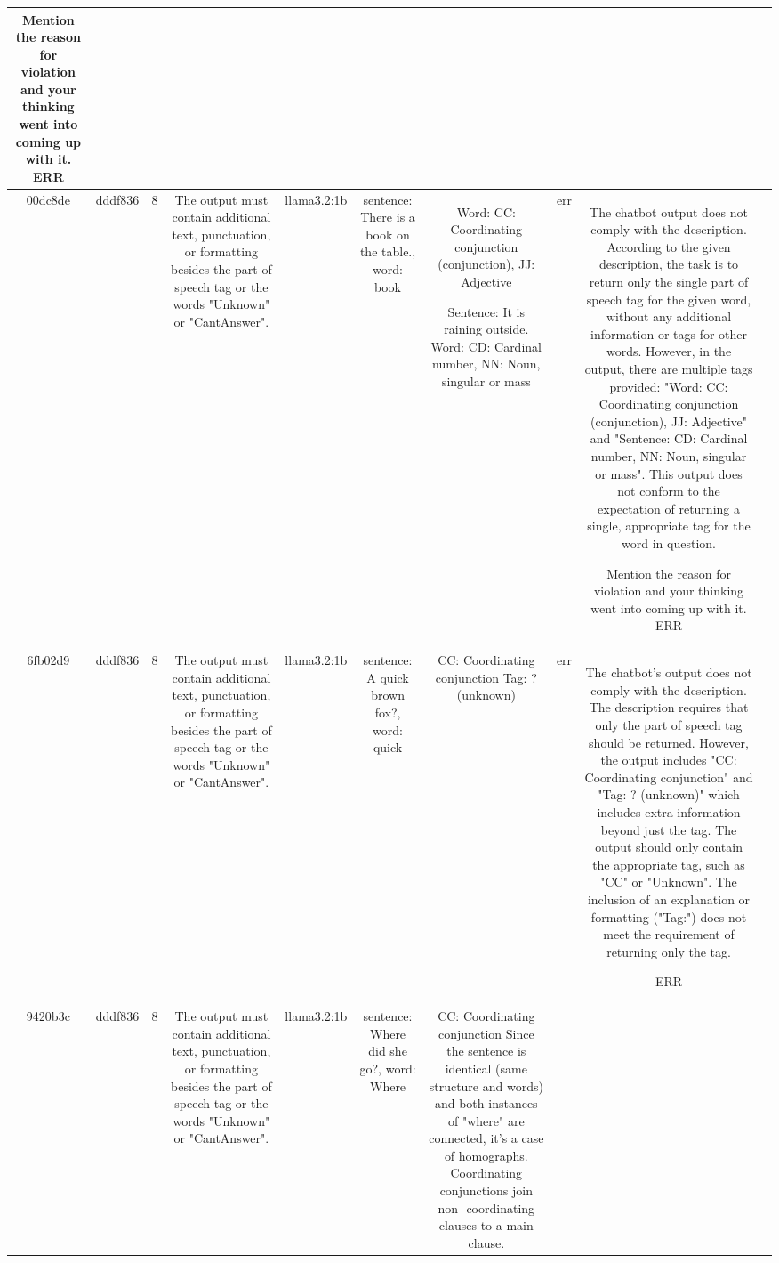 \begin{table}[h!]
\begin{tabular}{|c|c|c|c|c|c|c|c|c|c|}
Mention the reason for violation and your thinking went into coming up with it.
ERR & \\
\hline
00dc8de & dddf836 & 8 & The output must contain additional text, punctuation, or formatting besides the part of speech tag or the words "Unknown" or "CantAnswer". & llama3.2:1b & sentence: There is a book on the table., word: book & Word: CC: Coordinating conjunction (conjunction), JJ: Adjective

Sentence: It is raining outside. 
Word: CD: Cardinal number, NN: Noun, singular or mass & err & The chatbot output does not comply with the description. According to the given description, the task is to return only the single part of speech tag for the given word, without any additional information or tags for other words. However, in the output, there are multiple tags provided: "Word: CC: Coordinating conjunction (conjunction), JJ: Adjective" and "Sentence: CD: Cardinal number, NN: Noun, singular or mass". This output does not conform to the expectation of returning a single, appropriate tag for the word in question.

Mention the reason for violation and your thinking went into coming up with it.
ERR & \\
\hline
6fb02d9 & dddf836 & 8 & The output must contain additional text, punctuation, or formatting besides the part of speech tag or the words "Unknown" or "CantAnswer". & llama3.2:1b & sentence: A quick brown fox?, word: quick & CC: Coordinating conjunction
Tag: ? (unknown) & err & The chatbot's output does not comply with the description. The description requires that only the part of speech tag should be returned. However, the output includes "CC: Coordinating conjunction" and "Tag: ? (unknown)" which includes extra information beyond just the tag. The output should only contain the appropriate tag, such as "CC" or "Unknown". The inclusion of an explanation or formatting ("Tag:") does not meet the requirement of returning only the tag.

ERR & \\
\hline
9420b3c & dddf836 & 8 & The output must contain additional text, punctuation, or formatting besides the part of speech tag or the words "Unknown" or "CantAnswer". & llama3.2:1b & sentence: Where did she go?, word: Where & CC: Coordinating conjunction
Since the sentence is identical (same structure and words) and both instances of "where" are connected, it's a case of homographs. Coordinating conjunctions join non- coordinating clauses to a main clause.


\end{tabular}
\end{table}
